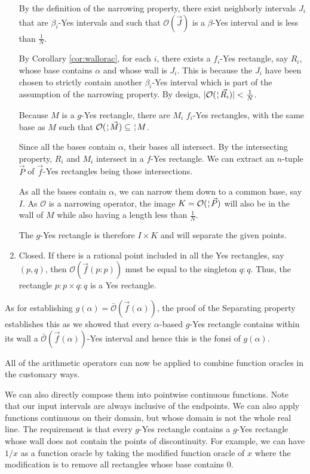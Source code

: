 \documentclass[12pt]{article}
\begin{document}
\begin{enumerate}
By the definition of the narrowing property, there exist neighborly intervals $J_i$ that are $\beta_i$-Yes intervals and such that $\mathcal{O}(\vec{J})$ is a $\beta$-Yes interval and is less than $\frac{1}{N}$. 

By Corollary \ref{cor:wallorac}, for each $i$, there exists a $f_i$-Yes rectangle, say $R_i$, whose base contains $\alpha$ and whose wall is $J_i$. This is because the $J_i$ have been chosen to strictly contain another $\beta_i$-Yes interval which is part of the assumption of the narrowing property. By design, $|\mathcal{O}(\wall{\vec{R_i}})| < \frac{1}{N}$.

Because $M$ is a $g$-Yes rectangle, there are $M_i$ $f_i$-Yes rectangles, with the same base as $M$ such that $\mathcal{O}(\wall{\vec{M}}) \subseteq \wall{M}$. 

Since all the bases contain $\alpha$, their bases all intersect. By the intersecting property, $R_i$ and $M_i$ intersect in a $f$-Yes rectangle. We can extract an $n$-tuple $\vec{P}$ of $\vec{f}$-Yes rectangles being those intersections. 

As all the bases contain $\alpha$, we can narrow them down to a common base, say $I$. As $\mathcal{O}$ is a narrowing operator, the image $K = \mathcal{O}(\wall{\vec{P}})$ will also be in the wall of $M$ while also having a length less than $\frac{1}{N}$. 

The $g$-Yes rectangle is therefore $I \times K$ and will separate the given points. 

\item Closed. If there is a rational point included in all the Yes rectangles, say $(p,q)$, then $\mathcal{O}(\vec{f}(p:p))$ must be equal to the singleton $q:q$. Thus, the rectangle $p:p \times q:q$ is a Yes rectangle.  

\end{enumerate}

As for establishing $g(\alpha) = \bar{\mathcal{O}}(\vec{f}(\alpha))$,  the proof of the Separating property establishes this as we showed that every $\alpha$-based $g$-Yes rectangle contains within its wall a  $\bar{\mathcal{O}}(\vec{f}(\alpha))$-Yes interval and hence this is the fonsi of $g(\alpha)$.

All of the arithmetic operators can now be applied to combine function oracles in the customary ways. 

We can also directly compose them into pointwise continuous functions. Note that our input intervals are always inclusive of the endpoints. We can also apply functions continuous on their domain, but whose domain is not the whole real line. The requirement is that every $g$-Yes rectangle contains a $g$-Yes rectangle whose wall does not contain the points of discontinuity. For example, we can have $1/x$ as a function oracle by taking the modified function oracle of $x$ where the modification is to remove all rectangles whose base contains 0. 
\end{document}
